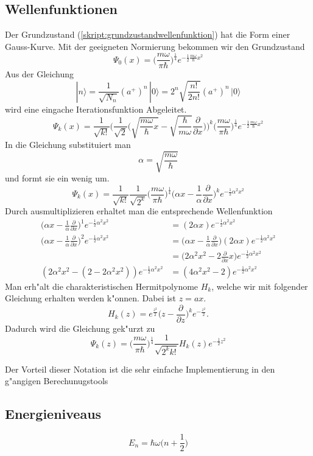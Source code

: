 \begin{refsection}
\subsection{Wellenfunktionen}
Der Grundzustand (\ref{skript:grundzustandwellenfunktion}) hat die Form einer Gauss-Kurve. Mit der geeigneten Normierung bekommen wir den Grundzustand
\[
\Psi_0(x)
=
\biggl(\frac{m\omega}{\pi\hbar}\biggr)^\frac14
e^{-\frac12\frac{m\omega}{\hbar}x^2}
\]
Aus der Gleichung
\[
|n\rangle
=
\frac{1}{\sqrt{N_n}}(a^+)^n\,|0\rangle
=
2^n \sqrt{\frac{n!}{2n!}} (a^+)^n\,|0\rangle
\]
wird eine eingache Iterationsfunktion Abgeleitet.
\[
\Psi_k(x)
=
\frac1{\sqrt{k!}}\biggl(\frac1{\sqrt{2}}
\biggl(\sqrt{\frac{m\omega}{\hbar}x}-
\sqrt{\frac{\hbar}{m\omega}}\frac{\partial}{\partial x}\biggr)\biggr)^k
\biggl(\frac{m\omega}{\pi\hbar}\biggr)^\frac14
e^{-\frac12\frac{m\omega}{\hbar}x^2}
\]
In die Gleichung substituiert man
\[
\alpha=\sqrt{\frac{m\omega}\hbar}
\]
und formt sie ein wenig um.
\[
\Psi_k(x)
=
\frac1{\sqrt{k!}}\frac1{\sqrt{2^k}}
\biggl(\frac{m\omega}{\pi\hbar}\biggr)^\frac14
\biggl(\alpha x-\frac1{\alpha}\frac{\partial}{\partial x}\biggr)^k
e^{-\frac12\alpha^2x^2}
\]
Durch ausmultiplizieren erhaltet man die entsprechende Wellenfunktion
\begin{align*}
\biggl(\alpha x-\frac1{\alpha}\frac{\partial}{\partial x}\biggr)^1
e^{-\frac12\alpha^2x^2}
&=
(2\alpha x)e^{-\frac12\alpha^2x^2}
\\
\biggl(\alpha x-\frac1{\alpha}\frac{\partial}{\partial x}\biggr)^2
e^{-\frac12\alpha^2x^2}
&=
\biggl(\alpha x-\frac1{\alpha}\frac{\partial}{\partial x}\biggr)
(2\alpha x)e^{-\frac12\alpha^2x^2}
\\
&=
\biggl(2\alpha^2 x^2-2\frac{\partial}{\partial x}x\biggr)
e^{-\frac12\alpha^2x^2}
\\
(2\alpha^2x^2-(2-2\alpha^2x^2))e^{-\frac12\alpha^2x^2}
&=
(4\alpha^2x^2-2)e^{-\frac12\alpha^2x^2}
\end{align*}
Man erh"alt die charakteristischen Hermitpolynome $H_k$, welche wir mit folgender Gleichung erhalten werden k"onnen. Dabei ist $z=ax$.
\[
H_k(z)
=
e^{\frac{z^2}2}\biggl(z-\frac{\partial}{\partial z}\biggr)^k
e^{-\frac{z^2}2}.
\]
Dadurch wird die Gleichung gek"urzt zu
\[
\Psi_k(z)
=
\biggl(\frac{m\omega}{\pi\hbar}\biggr)^\frac14
\frac1{\sqrt{2^k k!}}H_k(z)
e^{-\frac12 z^2}
\]

Der Vorteil dieser Notation ist die sehr einfache Implementierung in den g"angigen Berechunugstools

\subsection{Energieniveaus}
\[
E_n
=
\hbar\omega\biggl(n+\frac12\biggr)
\]


\end{refsection}
